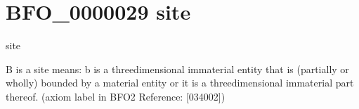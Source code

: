 \documentclass[letterpaper,10pt,english]{sphinxmanual}
\begin{document}
\begin{sphinxShadowBox}

\sphinxAtStartPar
{}
\end{sphinxShadowBox}
\begin{quote}
\label{\detokenize{doc-BFO_0000029:bfo-0000029}}\label{\detokenize{doc-BFO_0000029:site}}\label{\detokenize{doc-BFO_0000029:bfo-0000029}}
\ignorespaces \end{quote}


\section{BFO\_0000029 \sphinxhyphen{} site}
\label{\detokenize{doc-BFO_0000029:bfo-0000029-site}}\label{\detokenize{doc-BFO_0000029:index-0}}\label{\detokenize{doc-BFO_0000029::doc}}
\begin{sphinxShadowBox}

\sphinxAtStartPar
site
\end{sphinxShadowBox}

\begin{sphinxShadowBox}

\sphinxAtStartPar
B is a site means: b is a three\sphinxhyphen{}dimensional immaterial entity that is (partially or wholly) bounded by a material entity or it is a three\sphinxhyphen{}dimensional immaterial part thereof. (axiom label in BFO2 Reference: {[}034\sphinxhyphen{}002{]})
\end{sphinxShadowBox}
\end{document}
